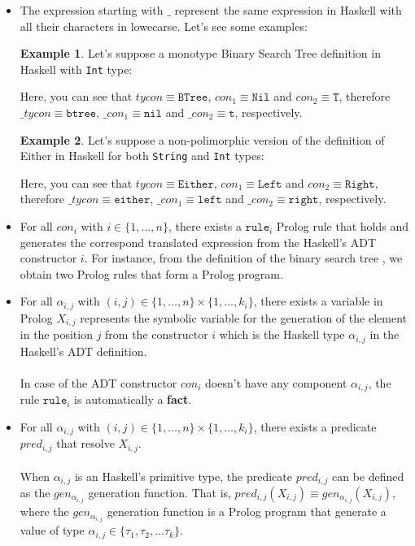 \documentclass{report}
\theoremstyle{definition}
\newtheorem{example}{Example}[section]
\theoremstyle{definition}
\newcommand{\ttt}[1]{\texttt{#1}}
\begin{document}
\begin{itemize}
	\item The expression starting with $\_$ represent the same expression in Haskell with all their characters in lowecarse. Let's see some examples:
	      	      
		\begin{example}
			Let's suppose a monotype Binary Search Tree definition in Haskell with \ttt{Int} type:
			
			Here, you can see that $tycon \equiv \ttt{BTree}$, $con_1 \equiv \ttt{Nil}$ and $con_2 \equiv \ttt{T}$, therefore $\_tycon \equiv \ttt{btree}$, $\_con_1 \equiv \ttt{nil}$ and $\_con_2 \equiv \ttt{t}$, respectively.
		\end{example}
		\begin{example}
			Let's suppose a non-polimorphic version of the definition of Either in Haskell for both \ttt{String} and \ttt{Int} types:
			
			Here, you can see that $tycon \equiv \ttt{Either}$, $con_1 \equiv \ttt{Left}$ and $con_2 \equiv \ttt{Right}$, therefore $\_tycon \equiv \ttt{either}$, $\_con_1 \equiv \ttt{left}$ and $\_con_2 \equiv \ttt{right}$, respectively.
		\end{example}
	      
	\item For all $con_i$ with $i \in \{1, \ldots, n \}$, there exists a $\ttt{rule}_i$ Prolog rule that holds and generates the correspond translated expression from the Haskell's ADT constructor $i$. For instance, from the definition of the binary search tree , we obtain two Prolog rules that form a Prolog program.
	\item For all $\alpha_{i,j}$ with $(i,j) \in \{1, \ldots, n \} \times \{1, \ldots, k_i \}$, there exists a variable in Prolog $X_{i,j}$ represents the symbolic variable for the generation of the element in the position $j$ from the constructor $i$ which is the Haskell type $\alpha_{i,j}$ in the Haskell's ADT definition.\\\\
	In case of the ADT constructor $con_i$ doesn't have any component $\alpha_{i,j}$, the rule $\ttt{rule}_i$ is automatically a \textbf{fact}.

	\item For all $\alpha_{i,j}$ with $(i,j) \in \{1, \ldots, n \} \times \{1, \ldots, k_i \}$, there exists a predicate $pred_{i,j}$ that resolve $X_{i,j}$.\\\\
	When $\alpha_{i,j}$ is an Haskell's primitive type, the predicate $pred_{i,j}$ can be defined as the $gen_{\alpha_{i,j}}$ generation function. That is, $pred_{i,j}(X_{i,j}) \equiv gen_{\alpha_{i,j}}(X_{i,j})$, where the $gen_{\alpha_{i,j}}$ generation function is a Prolog program that generate a value of type $\alpha_{i,j} \in \{ \tau_1 , \tau_2, \ldots \tau_k \}$.

\end{itemize}
\end{document}
